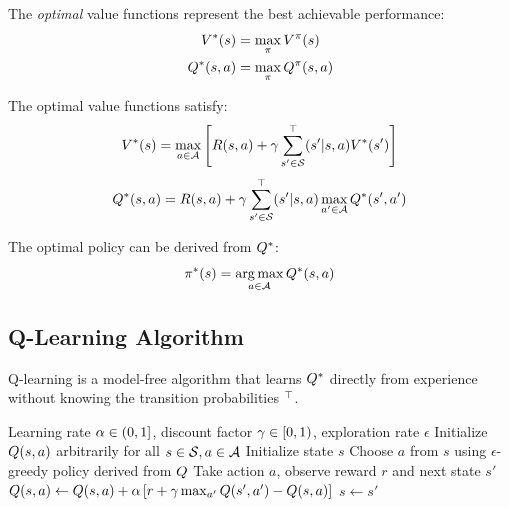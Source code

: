 The \textit{optimal} value functions represent the best achievable performance:
\begin{align}
V^*(s) &= \max_\pi V^\pi(s) \\
Q^*(s,a) &= \max_\pi Q^\pi(s,a)
\end{align}

\begin{theorem}
The optimal value functions satisfy:
\begin{equation}
V^*(s) = \max_{a \in \mathcal{A}} \left[ R(s,a) + \gamma \sum_{s' \in \mathcal{S}} ^\top(s'|s,a) V^*(s') \right]
\label{eq:bellman_optimal_v}
\end{equation}
\begin{equation}
Q^*(s,a) = R(s,a) + \gamma \sum_{s' \in \mathcal{S}} ^\top(s'|s,a) \max_{a' \in \mathcal{A}} Q^*(s', a')
\label{eq:bellman_optimal_q}
\end{equation}
\end{theorem}

The optimal policy can be derived from $Q^*$:
\begin{equation}
\pi^*(s) = \operatorname*{arg\,max}_{a \in \mathcal{A}} Q^*(s, a)
\label{eq:optimal_policy}
\end{equation}

\subsection{Q-Learning Algorithm}

Q-learning is a model-free algorithm that learns $Q^*$ directly from experience without knowing the transition probabilities $^\top$.

\begin{algorithm}[htbp]
\caption{Q-Learning Algorithm}
\label{alg:qlearning}
\begin{algorithmic}[1]
\Require Learning rate $\alpha \in (0,1]$, discount factor $\gamma \in [0,1)$, exploration rate $\epsilon$
\State Initialize $Q(s,a)$ arbitrarily for all $s \in \mathcal{S}, a \in \mathcal{A}$
    \State Initialize state $s$
        \State Choose $a$ from $s$ using $\epsilon$-greedy policy derived from $Q$
        \State Take action $a$, observe reward $r$ and next state $s'$
        \State $Q(s,a) \leftarrow Q(s,a) + \alpha \left[ r + \gamma \max_{a'} Q(s',a') - Q(s,a) \right]$
        \State $s \leftarrow s'$
    \EndWhile
\EndFor
\end{algorithmic}
\end{algorithm}


